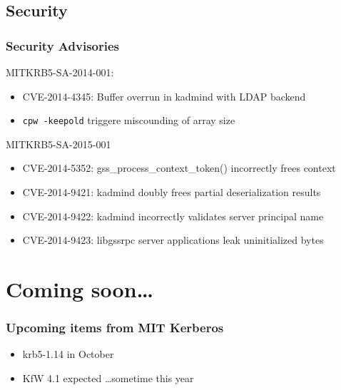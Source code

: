 \documentclass{beamer}
\begin{document}
\subsection{Security}

\begin{frame}[fragile]
\frametitle{Security Advisories}
MITKRB5-SA-2014-001:
\begin{itemize}
\item{CVE-2014-4345: Buffer overrun in kadmind with LDAP backend}
\item{\verb+cpw -keepold+ triggere miscounding of array size}
\end{itemize}
MITKRB5-SA-2015-001
\begin{itemize}
\item{CVE-2014-5352: gss_process_context_token() incorrectly frees context}
\item{CVE-2014-9421: kadmind doubly frees partial deserialization results}
\item{CVE-2014-9422: kadmind incorrectly validates server principal name}
\item{CVE-2014-9423: libgssrpc server applications leak uninitialized bytes}
\end{itemize}
\end{frame}

\section{Coming soon\ldots{}}

\begin{frame}
\frametitle{Upcoming items from MIT Kerberos}
\begin{itemize}
\item{krb5-1.14 in October}
\item{KfW 4.1 expected \ldots sometime this year}
\end{itemize}
\end{frame}
\end{document}
